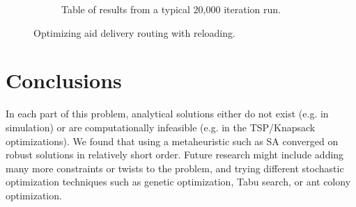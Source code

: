 \documentclass[a0,final]{a0poster}
\begin{document}
\begin{multicols}{3}
\begin{figure}[H]
\begin{subfigure}[b]{0.5\columnwidth}
	\vspace{1in}
    \caption{Table of results from a typical 20,000 iteration run.}
    \label{fig:b2}
  \end{subfigure}
  \caption{Optimizing aid delivery routing with reloading.}
\end{figure}

\vspace{-15mm}

\section*{Conclusions}

\vspace{-6mm}

In each part of this problem, analytical solutions either do not exist (e.g. in simulation) or are computationally infeasible (e.g. in the TSP/Knapsack optimizations).  We found that using a metaheuristic such as SA converged on robust solutions in relatively short order.  Future research might include adding many more constraints or twists to the problem, and trying different stochastic optimization techniques such as genetic optimization, Tabu search, or ant colony optimization.

\vfill




\end{multicols}
\end{document}
